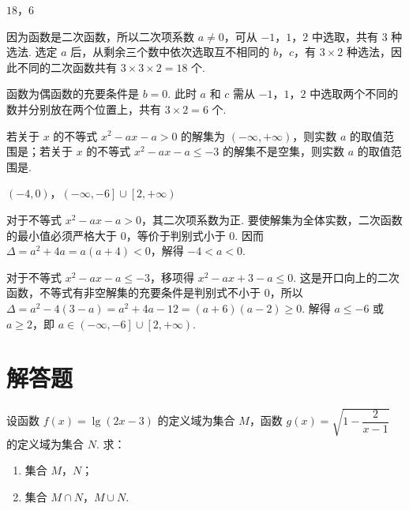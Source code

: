\begin{answer}
\(18\)，\(6\)
\end{answer}

\begin{solution}
因为函数是二次函数，所以二次项系数 \(a\neq0\)，可从 \(-1\)，\(1\)，\(2\) 中选取，共有 \(3\) 种选法. 选定 \(a\) 后，从剩余三个数中依次选取互不相同的 \(b\)，\(c\)，有 \(3\times2\) 种选法，因此不同的二次函数共有 \(3\times3\times2=18\) 个.

函数为偶函数的充要条件是 \(b=0\). 此时 \(a\) 和 \(c\) 需从 \(-1\)，\(1\)，\(2\) 中选取两个不同的数并分别放在两个位置上，共有 \(3\times2=6\) 个.
\end{solution}

\begin{problem}
若关于 \(x\) 的不等式 \(x^2-ax-a>0\) 的解集为 \(\left(-\infty,+\infty\right)\)，则实数 \(a\) 的取值范围是\fillinblank{}；若关于 \(x\) 的不等式 \(x^2-ax-a\leqslant-3\) 的解集不是空集，则实数 \(a\) 的取值范围是\fillinblank{}.
\end{problem}

\begin{answer}
\(\left(-4,0\right)\)，\(\left(-\infty,-6\right]\cup\left[2,+\infty\right)\)
\end{answer}

\begin{solution}
对于不等式 \(x^2-ax-a>0\)，其二次项系数为正. 要使解集为全体实数，二次函数的最小值必须严格大于 \(0\)，等价于判别式小于 \(0\). 因而 \(\Delta=a^2+4a=a(a+4)<0\)，解得 \(-4<a<0\).

对于不等式 \(x^2-ax-a\leqslant-3\)，移项得 \(x^2-ax+3-a\leqslant0\). 这是开口向上的二次函数，不等式有非空解集的充要条件是判别式不小于 \(0\)，所以 \(\Delta=a^2-4(3-a)=a^2+4a-12=(a+6)(a-2)\geqslant0\). 解得 \(a\leqslant-6\) 或 \(a\geqslant2\)，即 \(a\in\left(-\infty,-6\right]\cup\left[2,+\infty\right)\).
\end{solution}

\section{解答题}

\begin{problem}
设函数 \(f(x)=\lg(2x-3)\) 的定义域为集合 \(M\)，函数 \(g(x)=\sqrt{1-\dfrac{2}{x-1}}\) 的定义域为集合 \(N\). 求：

\begin{enumerate}
\item 集合 \(M\)，\(N\)；
\item 集合 \(M\cap N\)，\(M\cup N\).
\end{enumerate}
\end{problem}

